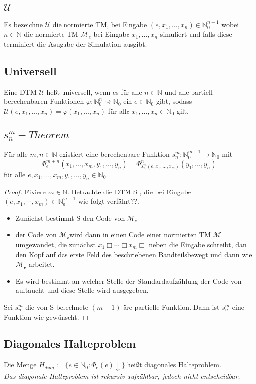 \subsection{\(\mathcal{U}\)}
    Es bezeichne \(\mathcal{U}\) die normierte TM, bei Eingabe \((e,x_1,\dots,x_n)\in\mathbb{N}_0^{n+1}\) wobei \(n\in\mathbb{N}\) die normierte TM \(\mathcal{M}_e\)
    bei Eingabe \(x_1,\dots,x_n\) simuliert und falls diese terminiert die Asugabe der Simulation ausgibt.
\subsection{Universell}
    Eine DTM \(\mathcal{U}\) heßt universell, wenn es für alle \(n\in\mathbb{N}\) und alle partiell berechenbaren Funktionen \(\varphi:\mathbb{N}_0^n\rightsquigarrow\mathbb{N}_0\) 
    ein \(e\in\mathbb{N}_0\) gibt, sodass \(\mathcal{U}(e,x_1,\dots,x_n)=\varphi(x_1,\dots,x_n)\) für alle \(x_1,\dots,x_n\in\mathbb{N}_0\) gilt.
\subsection{\(s^m_n-Theorem\)}
    Für alle \(m,n\in\mathbb{N}\) existiert eine berechenbare Funktion \(s_n^m:\mathbb{N}_0^{m+1}\to\mathbb{N}_0\) mit 
    \[\Phi_e^{m+n}(x_1,\dots,x_m,y_1,\dots,y_n)=\Phi^n_{s_n^m(e,x_1,\dots,x_m)}(y_1,\dots,y_n)\]
    für alle \(e,x_1,\dots,x_m,y_1,\dots,y_n\in\mathbb{N}_0\).\par\bigskip
    \begin{proof}
        Fixiere $m \in \mathbb{N}$. Betrachte die DTM S , die bei Eingabe $(e, x_1, \cdots, x_m) \in \mathbb{N}_0^{m+1}$ wie folgt verfährt??.
\begin{itemize}
  \item Zunächst bestimmt S den Code von $\mathcal{M}_e$ 
  \item der Code von $\mathcal{M_e}$wird dann in einen Code einer normierten TM $\mathcal{M}$ umgewandet, die zunächst $x_1\Box\cdots\Box x_m\Box$ neben die Eingabe schreibt, dan den Kopf auf das erste Feld des beschriebenen Bandteilsbewegt und dann wie $\mathcal{M_e}$ arbeitet.
  \item Es wird bestimmt an welcher Stelle der Standardaufzählung der Code von auftaucht und diese Stelle wird ausgegeben.
\end{itemize}
Sei $s_n^m$ die von S berechnete $(m+1)$-äre partielle Funktion. Dann ist $s_n^m$ eine Funktion wie gewünscht.
    \end{proof}
\subsection{Diagonales Halteproblem}
    Die Menge \(H_{diag}:=\{e\in\mathbb{N}_0:\Phi_e(e)\downarrow\}\) heißt diagonales Halteproblem.\\
    \textit{Das diagonale Halteproblem ist rekursiv aufzählbar, jedoch nicht entscheidbar.}
